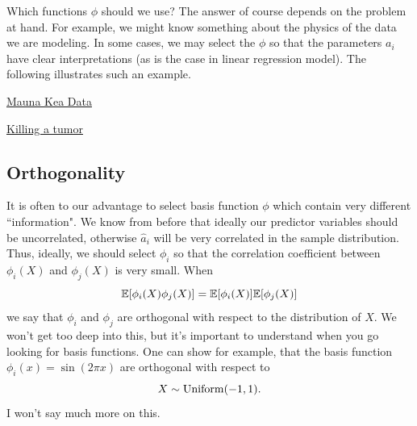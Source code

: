 Which functions $\phi$ should we use? The answer of course depends on the problem at hand. For example, we might know something about the physics of the data we are modeling. In some cases, we may select the $\phi$ so that the parameters $a_i$ have clear interpretations (as is the case in linear regression model). The following illustrates such an example.  

\begin{example}
\href{https://colab.research.google.com/drive/1euwp8RjQ-fNru49tcTqVWYlqp2swGO4Y#scrollTo=heNnoCg5QWut&line=1&uniqifier=1}{Mauna Kea Data}
\end{example}








\begin{exercise}
\href{https://colab.research.google.com/drive/1euwp8RjQ-fNru49tcTqVWYlqp2swGO4Y#scrollTo=heNnoCg5QWut&line=1&uniqifier=1}{Killing a tumor}
\end{exercise}






\subsection{Orthogonality}
It is often to our advantage to select basis function $\phi$ which contain very different ``information".  We know from before that ideally our predictor variables should be uncorrelated, otherwise $\hat{a}_i$ will be very correlated in the sample distribution. Thus, ideally, we should select $\phi_i$ so that the correlation coefficient between $\phi_i(X)$ and $\phi_j(X)$ is very small. When 
\begin{equation}
\mathbb E[\phi_i(X)\phi_j(X)] = \mathbb E[\phi_i(X)]\mathbb E[\phi_j(X)]
\end{equation}
we say that $\phi_i$ and $\phi_j$ are {\dfn orthogonal} with respect to the distribution of $X$. We won't get too deep into this, but it's important to understand when you go looking for basis functions. One can show for example, that the basis function $\phi_{i}(x) = \sin(2\pi x)$ are orthogonal with respect to 
\begin{equation}
X \sim {\rm Uniform}(-1,1).
\end{equation}
I won't say much more on this. 


